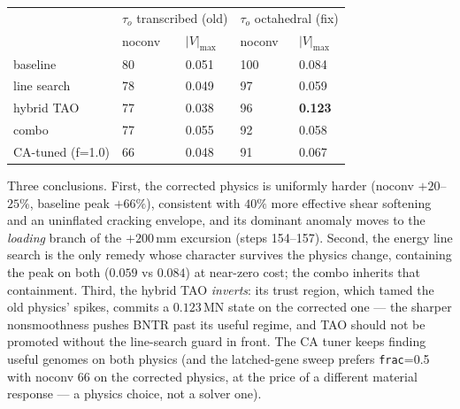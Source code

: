 \begin{center}
\begin{tabular}{@{}lllll@{}}
\toprule
& \multicolumn{2}{c}{$\tau_o$ transcribed (old)} &
  \multicolumn{2}{c}{$\tau_o$ octahedral (fix)} \\
& noconv & $|V|_{\max}$ & noconv & $|V|_{\max}$ \\
\midrule
baseline          & 80 & 0.051 & 100 & 0.084 \\
line search       & 78 & 0.049 & 97  & 0.059 \\
hybrid TAO        & 77 & 0.038 & 96  & \textbf{0.123} \\
combo             & 77 & 0.055 & 92  & 0.058 \\
CA-tuned (f=1.0)  & 66 & 0.048 & 91  & 0.067 \\
\bottomrule
\end{tabular}
\end{center}

Three conclusions. First, the corrected physics is uniformly harder
(noconv $+20$--$25\%$, baseline peak $+66\%$), consistent with
$40\%$ more effective shear softening and an uninflated cracking
envelope, and its dominant anomaly moves to the \emph{loading} branch
of the $+200$\,mm excursion (steps 154--157). Second, the energy line
search is the only remedy whose character survives the physics change,
containing the peak on both ($0.059$ vs $0.084$) at near-zero cost;
the combo inherits that containment. Third, the hybrid TAO
\emph{inverts}: its trust region, which tamed the old physics' spikes,
commits a $0.123$\,MN state on the corrected one --- the sharper
nonsmoothness pushes BNTR past its useful regime, and TAO should not
be promoted without the line-search guard in front. The CA tuner keeps
finding useful genomes on both physics (and the latched-gene sweep
prefers \texttt{frac}=0.5 with noconv 66 on the corrected physics,
at the price of a different material response --- a physics choice,
not a solver one).

